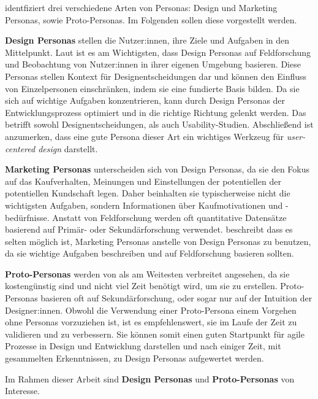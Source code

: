\textcite{tomlinUXOptimization2018} identfiziert drei verschiedene Arten von Personas: Design und Marketing Personas, sowie Proto-Personas. Im Folgenden sollen diese vorgestellt werden.

\textbf{Design Personas} stellen die Nutzer:innen, ihre Ziele und Aufgaben in den Mittelpunkt. Laut \textcite{tomlinUXOptimization2018} ist es am Wichtigsten, dass Design Personas auf Feldforschung und Beobachtung von Nutzer:innen in ihrer eigenen Umgebung basieren. Diese Personas stellen Kontext für Designentscheidungen dar und können den Einfluss von Einzelpersonen einschränken, indem sie eine fundierte Basis bilden.  Da sie sich auf wichtige Aufgaben konzentrieren, kann durch Design Personas der Entwicklungsprozess optimiert und in die richtige Richtung gelenkt werden. Das betrifft sowohl Designentscheidungen, als auch Usability-Studien. Abschließend ist anzumerken, dass eine gute Persona dieser Art ein wichtiges Werkzeug für \textit{user-centered design} darstellt.
\parencite{tomlinUXOptimization2018}

\textbf{Marketing Personas} unterscheiden sich von Design Personas, da sie den Fokus auf das Kaufverhalten, Meinungen und Einstellungen der potentiellen der potentiellen Kundschaft legen. Daher beinhalten sie typischerweise nicht die wichtigsten Aufgaben, sondern Informationen über Kaufmotivationen und -bedürfnisse. Anstatt von Feldforschung werden oft quantitative Datensätze basierend auf Primär- oder Sekundärforschung verwendet. \textcite{tomlinUXOptimization2018} beschreibt dass es selten möglich ist, Marketing Personas anstelle von Design Personas zu benutzen, da sie wichtige Aufgaben beschreiben und auf Feldforschung basieren sollten.
\parencite{tomlinUXOptimization2018}

\textbf{Proto-Personas} werden von \textcite{tomlinUXOptimization2018} als am Weitesten verbreitet angesehen, da sie kostengünstig sind und nicht viel Zeit benötigt wird, um sie zu erstellen. Proto-Personas basieren oft auf Sekundärforschung, oder sogar nur auf der Intuition der Designer:innen. Obwohl die Verwendung einer Proto-Persona einem Vorgehen ohne Personas vorzuziehen ist, ist es empfehlenswert, sie im Laufe der Zeit zu validieren und zu verbessern. Sie können somit einen guten Startpunkt für agile Prozesse in Design und Entwicklung darstellen und nach einiger Zeit, mit gesammelten Erkenntnissen, zu Design Personas aufgewertet werden.
\parencite{tomlinUXOptimization2018}

Im Rahmen dieser Arbeit sind \textbf{Design Personas} und \textbf{Proto-Personas} von Interesse.

